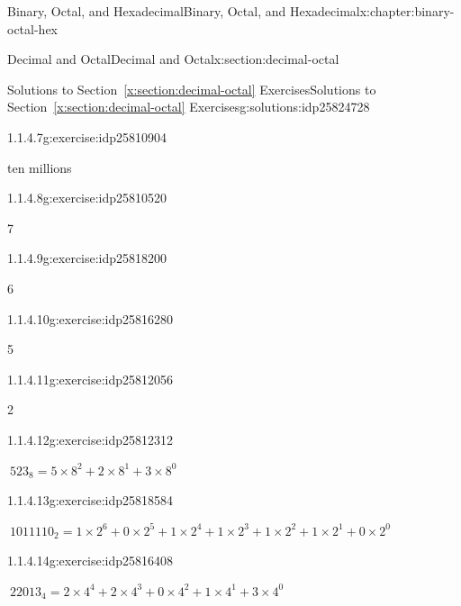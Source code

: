 \documentclass[twoside,10pt,]{book}
\newcommand{\xreffont}{\relax}
\numberwithin{equation}{section}
\begin{document}
\begin{chapterptx}{Binary, Octal, and Hexadecimal}{}{Binary, Octal, and Hexadecimal}{}{}{x:chapter:binary-octal-hex}
\begin{sectionptx}{Decimal and Octal}{}{Decimal and Octal}{}{}{x:section:decimal-octal}
\begin{solutions-subsection}{Solutions to Section~{\xreffont\ref*{x:section:decimal-octal}} Exercises}{}{Solutions to Section~{\xreffont\ref*{x:section:decimal-octal}} Exercises}{}{}{g:solutions:idp25824728}
\begin{exercisegroup}
\begin{divisionsolutioneg}{1.1.4.7}{}{g:exercise:idp25810904}
\par\smallskip%
\noindent\hypertarget{g:solution:idp25803224-main}{}ten millions\end{divisionsolutioneg}%
\end{exercisegroup}
\par\medskip\noindent
\begin{exercisegroup}
\begin{divisionsolutioneg}{1.1.4.8}{}{g:exercise:idp25810520}%
\par\smallskip%
\noindent\hypertarget{g:solution:idp25815128-main}{}7\end{divisionsolutioneg}%
\begin{divisionsolutioneg}{1.1.4.9}{}{g:exercise:idp25818200}%
\par\smallskip%
\noindent\hypertarget{g:solution:idp25817560-main}{}6\end{divisionsolutioneg}%
\begin{divisionsolutioneg}{1.1.4.10}{}{g:exercise:idp25816280}%
\par\smallskip%
\noindent\hypertarget{g:solution:idp25818328-main}{}5\end{divisionsolutioneg}%
\begin{divisionsolutioneg}{1.1.4.11}{}{g:exercise:idp25812056}%
\par\smallskip%
\noindent\hypertarget{g:solution:idp25816024-main}{}2\end{divisionsolutioneg}%
\end{exercisegroup}
\par\medskip\noindent
\begin{exercisegroup}
\begin{divisionsolutioneg}{1.1.4.12}{}{g:exercise:idp25812312}%
\par\smallskip%
\noindent\hypertarget{g:solution:idp25815000-main}{}\(\ 523_8=5\times 8^2+2\times 8^1+3\times 8^0\)\end{divisionsolutioneg}%
\begin{divisionsolutioneg}{1.1.4.13}{}{g:exercise:idp25818584}%
\par\smallskip%
\noindent\hypertarget{g:solution:idp25813336-main}{}\(\ 1011110_2=1\times2^6+0\times2^5+1\times2^4+1\times2^3+1\times2^2+1\times2^1+0\times2^0\)\end{divisionsolutioneg}%
\begin{divisionsolutioneg}{1.1.4.14}{}{g:exercise:idp25816408}%
\par\smallskip%
\noindent\hypertarget{g:solution:idp25815896-main}{}\(\ 22013_4=2\times 4^4+2\times4^3+0\times4^2+1\times4^1+3\times4^0\)\end{divisionsolutioneg}%

\end{exercisegroup}
\end{solutions-subsection}
\end{sectionptx}
\end{chapterptx}
\end{document}
